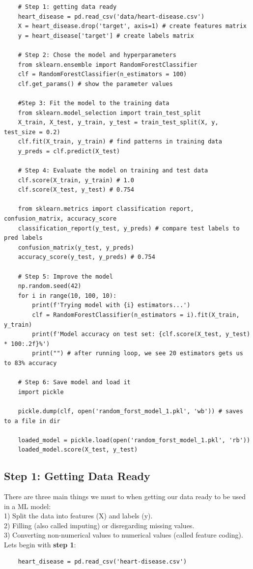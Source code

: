 \documentclass[11pt, a4paper]{article}
\begin{document}
\begin{spacing}{1.1}
\begin{lstlisting}
	# Step 1: getting data ready
	heart_disease = pd.read_csv('data/heart-disease.csv')
	X = heart_disease.drop('target', axis=1) # create features matrix
	y = heart_disease['target'] # create labels matrix
	
	# Step 2: Chose the model and hyperparameters
	from sklearn.ensemble import RandomForestClassifier
	clf = RandomForestClassifier(n_estimators = 100) 
	clf.get_params() # show the parameter values
	
	#Step 3: Fit the model to the training data
	from sklearn.model_selection import train_test_split
	X_train, X_test, y_train, y_test = train_test_split(X, y, test_size = 0.2)
	clf.fit(X_train, y_train) # find patterns in training data
	y_preds = clf.predict(X_test)
	
	# Step 4: Evaluate the model on training and test data
	clf.score(X_train, y_train) # 1.0
	clf.score(X_test, y_test) # 0.754
	
	from sklearn.metrics import classification report, confusion_matrix, accuracy_score
	classification_report(y_test, y_preds) # compare test labels to pred labels
	confusion_matrix(y_test, y_preds)
	accuracy_score(y_test, y_preds) # 0.754
	
	# Step 5: Improve the model
	np.random.seed(42)
	for i in range(10, 100, 10): 
		print(f'Trying model with {i} estimators...')
		clf = RandomForestClassifier(n_estimators = i).fit(X_train, y_train)
		print(f'Model accuracy on test set: {clf.score(X_test, y_test) * 100:.2f}%')
		print("") # after running loop, we see 20 estimators gets us to 83% accuracy
	
	# Step 6: Save model and load it
	import pickle
	
	pickle.dump(clf, open('random_forst_model_1.pkl', 'wb')) # saves to a file in dir
	
	loaded_model = pickle.load(open('random_forst_model_1.pkl', 'rb'))
	loaded_model.score(X_test, y_test)	\end{lstlisting} \newpage
	
	\subsection{Step 1: Getting Data Ready}
	There are three main things we must to when getting our data ready to be used in a ML model: \\
	\hspace*{2mm} 1) Split the data into features (X) and labels (y). \\
	\hspace*{2mm} 2) Filling (also called imputing) or disregarding missing values. \\
	\hspace*{2mm} 3) Converting non-numerical values to numerical values (called feature coding). \vspace*{2mm} \\
	Lets begin with \textbf{step 1}:
	\begin{lstlisting}
	heart_disease = pd.read_csv('heart-disease.csv')
	

\end{lstlisting}
\end{spacing}
\end{document}
